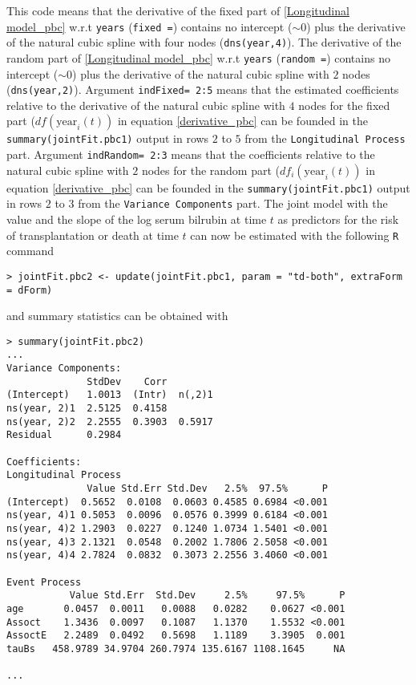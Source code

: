 \documentclass[12pt]{article}
\begin{document}
This code means that the derivative of the fixed part of \eqref{Longitudinal model_pbc} w.r.t \texttt{years} (\texttt{fixed =}) contains no intercept (\texttt{$\sim 0$}) plus the derivative of the natural cubic spline with four nodes (\texttt{dns(year,4)}). The derivative of the random part of \eqref{Longitudinal model_pbc} w.r.t \texttt{years} (\texttt{random =}) contains no intercept (\texttt{$\sim 0$}) plus the derivative of the natural cubic spline with $2$ nodes (\texttt{dns(year,2)}). Argument \texttt{indFixed= 2:5} means that the estimated coefficients relative to the derivative of the natural cubic spline with $4$ nodes for the fixed part ($df(\text{year}_i(t))$ in equation \eqref{derivative_pbc} can be founded in the \texttt{summary(jointFit.pbc1)} output in rows $2$ to $5$ from the \texttt{Longitudinal Process} part. Argument \texttt{indRandom= 2:3} means that the coefficients relative to the natural cubic spline with $2$ nodes for the random part ($df_i(\text{year}_i(t))$ in equation \eqref{derivative_pbc} can be founded in the \texttt{summary(jointFit.pbc1)} output in rows $2$ to $3$ from the \texttt{Variance Components} part. The joint model with the value and the slope of the log serum bilrubin at time $t$ as predictors for the risk of transplantation or death at time $t$ can now be estimated with the following \texttt{R} command
\begin{verbatim}
> jointFit.pbc2 <- update(jointFit.pbc1, param = "td-both", extraForm = dForm)
\end{verbatim}
and summary statistics can be obtained with
\begin{verbatim}
> summary(jointFit.pbc2)
...
Variance Components:
              StdDev    Corr
(Intercept)   1.0013  (Intr)  n(,2)1
ns(year, 2)1  2.5125  0.4158
ns(year, 2)2  2.2555  0.3903  0.5917
Residual      0.2984

Coefficients:
Longitudinal Process
              Value Std.Err Std.Dev   2.5%  97.5%      P
(Intercept)  0.5652  0.0108  0.0603 0.4585 0.6984 <0.001
ns(year, 4)1 0.5053  0.0096  0.0576 0.3999 0.6184 <0.001
ns(year, 4)2 1.2903  0.0227  0.1240 1.0734 1.5401 <0.001
ns(year, 4)3 2.1321  0.0548  0.2002 1.7806 2.5058 <0.001
ns(year, 4)4 2.7824  0.0832  0.3073 2.2556 3.4060 <0.001

Event Process
           Value Std.Err  Std.Dev     2.5%     97.5%      P
age       0.0457  0.0011   0.0088   0.0282    0.0627 <0.001
Assoct    1.3436  0.0097   0.1087   1.1370    1.5532 <0.001
AssoctE   2.2489  0.0492   0.5698   1.1189    3.3905  0.001
tauBs   458.9789 34.9704 260.7974 135.6167 1108.1645     NA

...
\end{verbatim}
\end{document}
